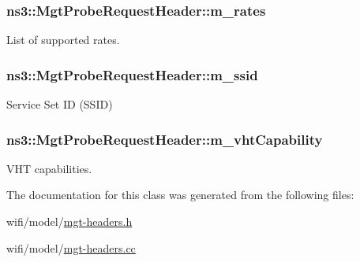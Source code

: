 \subsubsection[{\texorpdfstring{m\+\_\+rates}{m_rates}}]{ ns3\+::\+Mgt\+Probe\+Request\+Header\+::m\+\_\+rates\hspace{0.3cm}{\ttfamily [private]}}\hypertarget{classns3_1_1MgtProbeRequestHeader_a82d1da521d934e187f00b38867f244d3}{}\label{classns3_1_1MgtProbeRequestHeader_a82d1da521d934e187f00b38867f244d3}


List of supported rates. 

\subsubsection[{\texorpdfstring{m\+\_\+ssid}{m_ssid}}]{ ns3\+::\+Mgt\+Probe\+Request\+Header\+::m\+\_\+ssid\hspace{0.3cm}{\ttfamily [private]}}\hypertarget{classns3_1_1MgtProbeRequestHeader_a3bf06be379f216965c5534bb19d21fc1}{}\label{classns3_1_1MgtProbeRequestHeader_a3bf06be379f216965c5534bb19d21fc1}


Service Set ID (S\+S\+ID) 

\subsubsection[{\texorpdfstring{m\+\_\+vht\+Capability}{m_vhtCapability}}]{ ns3\+::\+Mgt\+Probe\+Request\+Header\+::m\+\_\+vht\+Capability\hspace{0.3cm}{\ttfamily [private]}}\hypertarget{classns3_1_1MgtProbeRequestHeader_acfd190373f8c431aa709e18d44fb368f}{}\label{classns3_1_1MgtProbeRequestHeader_acfd190373f8c431aa709e18d44fb368f}


V\+HT capabilities. 



The documentation for this class was generated from the following files\+:\begin{DoxyCompactItemize}
\item 
wifi/model/\hyperlink{mgt-headers_8h}{mgt-\/headers.\+h}\item 
wifi/model/\hyperlink{mgt-headers_8cc}{mgt-\/headers.\+cc}\end{DoxyCompactItemize}
